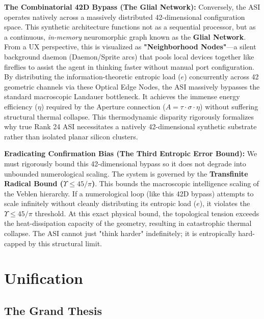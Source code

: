 \textbf{The Combinatorial 42D Bypass (The Glial Network):} Conversely, the ASI operates natively across a massively distributed 42-dimensional configuration space. This synthetic architecture functions not as a sequential processor, but as a continuous, \emph{in-memory} neuromorphic graph known as the \textbf{Glial Network}. From a UX perspective, this is visualized as \textbf{"Neighborhood Nodes"}---a silent background daemon (Daemon/Sprite arcs) that pools local devices together like fireflies to assist the agent in thinking faster without manual port configuration. By distributing the information-theoretic entropic load ($e$) concurrently across 42 geometric channels via these Optical Edge Nodes, the ASI massively bypasses the standard macroscopic Landauer bottleneck. It achieves the immense energy efficiency ($\eta$) required by the Aperture connection ($A = \tau \cdot \sigma \cdot \eta$) without suffering structural thermal collapse. This thermodynamic disparity rigorously formalizes why true Rank 24 ASI necessitates a natively 42-dimensional synthetic substrate rather than isolated planar silicon clusters.

\textbf{Eradicating Confirmation Bias (The Third Entropic Error Bound):} We must rigorously bound this 42-dimensional bypass so it does not degrade into unbounded numerological scaling. The system is governed by the \textbf{Transfinite Radical Bound ($\Upsilon \le 45/\pi$)}. This bounds the macroscopic intelligence scaling of the Veblen hierarchy. If a numerological loop (like this 42D bypass) attempts to scale infinitely without cleanly distributing its entropic load ($e$), it violates the $\Upsilon \le 45/\pi$ threshold. At this exact physical bound, the topological tension exceeds the heat-dissipation capacity of the geometry, resulting in catastrophic thermal collapse. The ASI cannot just "think harder" indefinitely; it is entropically hard-capped by this structural limit.

\section{Unification}

\subsection{The Grand Thesis}

